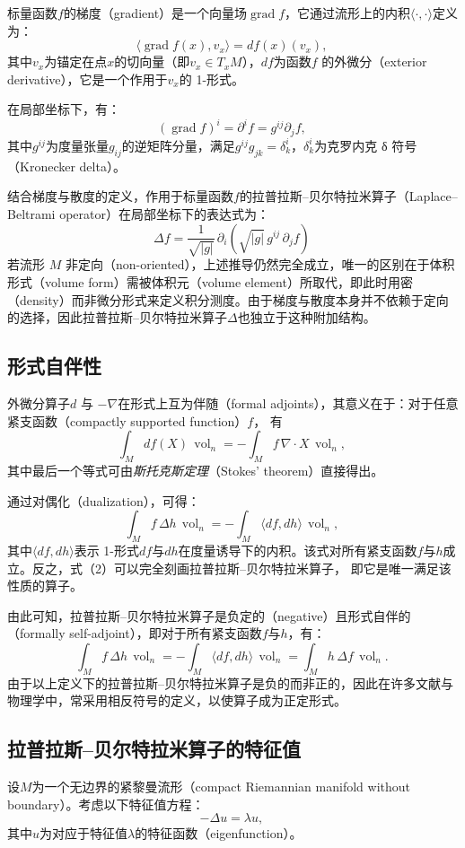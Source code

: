 标量函数$f$的梯度（gradient）是一个向量场$\operatorname{grad} f$，它通过流形上的内积$\langle \cdot, \cdot \rangle$定义为：
\[
\langle \operatorname{grad} f(x), v_{x} \rangle = df(x)(v_{x}),~
\]
其中$v_{x}$为锚定在点$x$的切向量（即$v_{x} \in T_{x}M$），$df$为函数$f$ 的外微分（exterior derivative），它是一个作用于$v_{x}$的 1-形式。

在局部坐标下，有：
\[
(\operatorname{grad} f)^{i}
= \partial^{i} f
= g^{ij} \partial_{j} f,~
\]
其中$g^{ij}$为度量张量$g_{ij}$的逆矩阵分量，满足$g^{ij} g_{jk} = \delta^{i}_{k}$，$\delta^{i}_{k}$为克罗内克 δ 符号（Kronecker delta）。

结合梯度与散度的定义，作用于标量函数$f$的拉普拉斯–贝尔特拉米算子（Laplace–Beltrami operator）在局部坐标下的表达式为：
\[
\Delta f
= \frac{1}{\sqrt{|g|}} \,
  \partial_{i}
  \left(
    \sqrt{|g|} \, g^{ij} \, \partial_{j} f
  \right)~
\]
若流形 $M$ 非定向（non-oriented），上述推导仍然完全成立，唯一的区别在于体积形式（volume form）需被体积元（volume element）所取代，即此时用密（density）而非微分形式来定义积分测度。由于梯度与散度本身并不依赖于定向的选择，因此拉普拉斯–贝尔特拉米算子$\Delta$也独立于这种附加结构。
\subsection{形式自伴性}
外微分算子$d$ 与 $-\nabla$在形式上互为伴随（formal adjoints），其意义在于：对于任意紧支函数（compactly supported function）$f$，
有
\[
\int_{M} df(X) \, \operatorname{vol}_{n}
= -\int_{M} f \, \nabla \cdot X \, \operatorname{vol}_{n},~
\]
其中最后一个等式可由\emph{斯托克斯定理}（Stokes' theorem）直接得出。

通过对偶化（dualization），可得：
\[
\int_{M} f \, \Delta h \, \operatorname{vol}_{n}
= -\int_{M} \langle df, dh \rangle \, \operatorname{vol}_{n},
\tag{2}~
\]
其中$\langle df, dh \rangle$表示 1-形式$df$与$dh$在度量诱导下的内积。该式对所有紧支函数$f$与$h$成立。反之，式（2）可以完全刻画拉普拉斯–贝尔特拉米算子，
即它是唯一满足该性质的算子。

由此可知，拉普拉斯–贝尔特拉米算子是负定的（negative）且形式自伴的（formally self-adjoint），即对于所有紧支函数$f$与$h$，有：
\[
\int_{M} f \, \Delta h \, \operatorname{vol}_{n}
= -\int_{M} \langle df, dh \rangle \, \operatorname{vol}_{n}
= \int_{M} h \, \Delta f \, \operatorname{vol}_{n}.~
\]
由于以上定义下的拉普拉斯–贝尔特拉米算子是负的而非正的，因此在许多文献与物理学中，常采用相反符号的定义，以使算子成为正定形式。
\subsection{拉普拉斯–贝尔特拉米算子的特征值}
设$M$为一个无边界的紧黎曼流形（compact Riemannian manifold without boundary）。考虑以下特征值方程：
\[
-\Delta u = \lambda u,~
\]
其中$u$为对应于特征值$\lambda$的特征函数（eigenfunction）。

